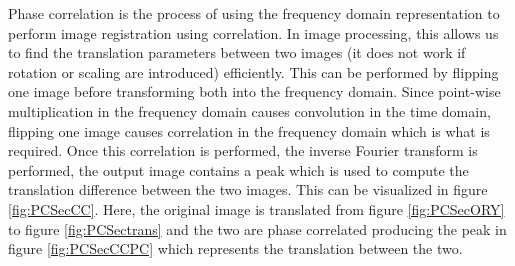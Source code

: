 Phase correlation is the process of using the frequency domain representation to perform image registration using correlation. In image processing, this allows us to find the translation parameters between two images (it does not work if rotation or scaling are introduced) efficiently. This can be performed by flipping one image before transforming both into the frequency domain. Since point-wise multiplication in the frequency domain causes convolution in the time domain, flipping one image causes correlation in the frequency domain which is what is required. Once this correlation is performed, the inverse Fourier transform is performed, the output image contains a peak which is used to compute the translation difference between the two images. This can be visualized in figure \ref{fig:PCSecCC}. Here, the original image is translated from figure \ref{fig:PCSecORY} to figure \ref{fig:PCSectrans} and the two are phase correlated producing the peak in figure \ref{fig:PCSecCCPC} which represents the translation between the two. \\


